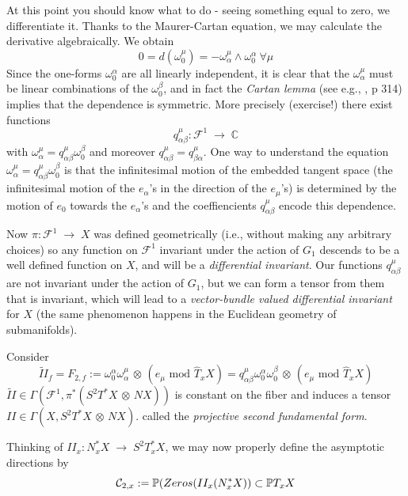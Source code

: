 \documentclass[11pt]{amsart}
\theoremstyle{definition}
\theoremstyle{remark}
\numberwithin{equation}{section}
\def\ooo#1#2{\omega^{#1}_{#2}}\def\xxx#1#2{x^{#1}_{#2}}
\def\oo#1{\omega^{#1}_0}
\def\qq#1#2#3{q^{#1}_{{#2} {#3}}}
\def\ee#1{e_{#1}}
\def\cf{\mathcal F}
\def\BC{\mathbb C}\def\BF{\mathbb F}\def\BO{\mathbb O}\def\BS{\mathbb S}
\def\BP{\mathbb P}
\def\ww{\wedge}
\def\a{\alpha}
\def\b{\beta}
\def\ot{{\mathord{\,\otimes }\,}}
\def\ra{{\mathord{\;\rightarrow\;}}}
\def\tmod{\text{ mod }}
\begin{document}
At this point you should know what to do - seeing something equal to
zero, we differentiate it. Thanks to the Maurer-Cartan equation, we may
calculate the derivative algebraically. We obtain
$$
0=d(\oo\mu)=-\ooo\mu\a\ww\oo\a \ \forall \mu
$$
Since the one-forms $\oo\a$ are all linearly independent,
  it is clear that the $\ooo\mu\a$ must be linear combinations
of the $\oo\b$, and in fact the {\it Cartan lemma} (see e.g.,  \cite{EDSBK}, p 314) implies that
the dependence is symmetric. More precisely (exercise!) there exist
functions
$$
\qq\mu\a\b : \cf^1\ra \BC
$$
with $\ooo\mu\a=\qq\mu\a\b\oo\b$ and moreover $\qq\mu\a\b=\qq\mu\b\a$.
One way to understand the equation $\ooo\mu\a=\qq\mu\a\b\oo\b$ is that the infinitesimal motion of the embedded tangent
space (the infinitesimal motion of the $e_{\a}$'s in the direction of
the $e_{\mu}$'s)    is determined by the motion of $e_0$ towards
the $e_{\a}$'s and the coeffiencients $\qq\mu\a\b$ encode
this dependence.

Now $\pi: \cf^1\ra X$ was defined   geometrically (i.e., without making
any arbitrary choices) so any function on $\cf^1$ invariant under the
action of $G_1$ descends to be a well defined function on $X$, and
will be a {\it differential invariant}. Our functions $\qq\mu\a\b$ are not
invariant under the action of $G_1$, but we can form a tensor
from them that is invariant, which will lead to a {\it vector-bundle
valued differential invariant} for $X$ (the same phenomenon happens
in the Euclidean geometry of submanifolds).

  Consider 
$$\tilde {II}_f=F_{2,f}:=\oo\a\ooo\mu\a\ot (\ee\mu \tmod \hat T_xX)=
\qq\mu\a\b\oo\a\oo\b\ot (\ee\mu \tmod \hat T_xX)
$$
$\tilde {II} \in \Gamma (\cf^1,\pi^*(S^2T^*X\ot NX))$ is constant on the fiber
and induces a tensor
$II\in \Gamma (X, S^2T^*X\ot NX)$. called the {\it projective second fundamental form}.

Thinking of $II_x: N^*_xX\ra S^2T^*_xX$, we may now properly define the asymptotic directions by
$$
\cC_{2,x}:= \BP (Zeros(II_x(N^*_xX))\subset \BP T_xX
$$
\end{document}

